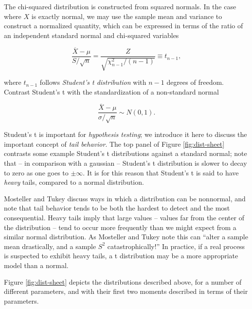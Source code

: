 \documentclass[../primer.tex]{subfiles}
\begin{document}
The chi-squared distribution is constructed from squared normals. In the case
where $X$ is exactly normal, we may use the sample mean and variance to
construct a normalized quantity, which can be expressed in terms of the ratio of
an independent standard normal and chi-squared variables

\begin{equation} \label{eq:t-def}
  \frac{\overline{X} - \mu}{S/\sqrt{n}} = \frac{Z}{\sqrt{\chi^2_{n-1}/(n-1)}} \equiv t_{n-1},
\end{equation}

\noindent where $t_{n-1}$ follows \emph{Student's t distribution} with $n-1$
degrees of freedom. Contrast Student's t with the standardization of a
non-standard normal

\begin{equation}
  \frac{\overline{X} - \mu}{\sigma/\sqrt{n}} \sim N(0, 1).
\end{equation}

Student's t is important for \emph{hypothesis testing}; we introduce it here to
discuss the important concept of \emph{tail behavior}. The top panel of Figure
\ref{fig:dist-sheet} contrasts some example Student's t distributions against a
standard normal; note that -- in comparison with a gaussian -- Student's t
distribution is slower to decay to zero as one goes to $\pm\infty$. It is for
this reason that Student's t is said to have \emph{heavy} tails, compared to a
normal distribution.

Mosteller and Tukey\cite{mosteller1977data} discuss ways in which a distribution
can be nonnormal, and note that tail behavior tends to be both the hardest to
detect and the most consequential. Heavy tails imply that large values -- values
far from the center of the distribution -- tend to occur more frequently than we
might expect from a similar normal distribution. As Mosteller and Tukey note
this can ``alter a sample mean drastically, and a sample $S^2$
catastrophically!'' In practice, if a real process is suspected to exhibit heavy
tails, a t distribution may be a more appropriate model than a normal.

Figure \ref{fig:dist-sheet} depicts the distributions described above, for a
number of different parameters, and with their first two moments described in
terms of their parameters.
\end{document}
